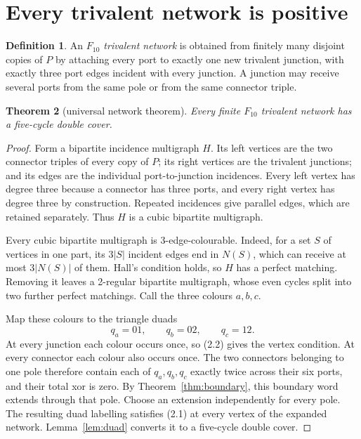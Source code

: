 \documentclass[11pt]{article}
\newtheorem{theorem}{Theorem}[section]
\theoremstyle{definition}
\newtheorem{definition}[theorem]{Definition}
\theoremstyle{remark}
\numberwithin{equation}{section}
\begin{document}
\section{Every trivalent network is positive}

\begin{definition}
An \emph{\(F_{10}\) trivalent network} is obtained from finitely many
disjoint copies of \(P\) by attaching every port to exactly one new
trivalent junction, with exactly three port edges incident with every
junction.  A junction may receive several ports from the same pole or
from the same connector triple.
\end{definition}

\begin{theorem}[universal network theorem]
\label{thm:network}
Every finite \(F_{10}\) trivalent network has a five-cycle double cover.
\end{theorem}

\begin{proof}
Form a bipartite incidence multigraph \(H\).  Its left vertices are the
two connector triples of every copy of \(P\); its right vertices are the
trivalent junctions; and its edges are the individual port-to-junction
incidences.  Every left vertex has degree three because a connector has
three ports, and every right vertex has degree three by construction.
Repeated incidences give parallel edges, which are retained separately.
Thus \(H\) is a cubic bipartite multigraph.

Every cubic bipartite multigraph is 3-edge-colourable.  Indeed, for a set
\(S\) of vertices in one part, its \(3|S|\) incident edges end in
\(N(S)\), which can receive at most \(3|N(S)|\) of them.  Hall's condition
holds, so \(H\) has a perfect matching.  Removing it leaves a 2-regular
bipartite multigraph, whose even cycles split into two further perfect
matchings.  Call the three colours \(a,b,c\).

Map these colours to the triangle duads
\[
                  q_a=01,\qquad q_b=02,\qquad q_c=12.
\]
At every junction each colour occurs once, so (2.2) gives the vertex
condition.  At every connector each colour also occurs once.  The two
connectors belonging to one pole therefore contain each of
\(q_a,q_b,q_c\) exactly twice across their six ports, and their total xor
is zero.  By Theorem~\ref{thm:boundary}, this boundary word extends through
that pole.  Choose an extension independently for every pole.  The
resulting duad labelling satisfies (2.1) at every vertex of the expanded
network.  Lemma~\ref{lem:duad} converts it to a five-cycle double cover.
\end{proof}
\end{document}
